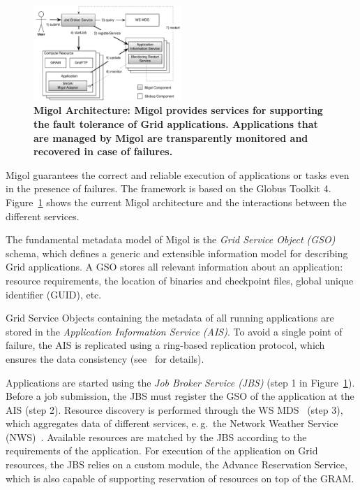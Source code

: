 \documentclass[times, 10pt, twocolumn]{article}
\newcommand{\up}{\vspace*{-1em}}
\begin{document}
\label{sec:migol}

\up
\begin{figure}[h]
 \centering
 \includegraphics[width=0.5\textwidth]{migol_architecture}
 \caption{\small \bf Migol Architecture: Migol provides services for
 supporting the fault tolerance of Grid applications. Applications that are managed by
 Migol are transparently monitored and recovered in case of
 failures.\up\up
 }
 \label{fig:migol_architecture} 
\end{figure}           


Migol guarantees the correct and reliable exe\-cution of applications
or tasks even in the presence of failures. The framework is based on
the Globus Toolkit 4.  Figure~\ref{fig:migol_architecture} shows the
current Migol architecture and the interactions between the different
services.

The fundamental metadata model of Migol is the \emph{Grid Service
  Object (GSO)} schema, which defines a generic and extensible
information model for describing Grid applications.
A GSO stores all relevant information about an application: resource
requirements, the location of binaries and checkpoint files, global
unique identifier (GUID), etc.

Grid Service Objects containing the metadata of all running
applications are stored in the {\em Application Information Service
  (AIS)}.
To avoid a single point of failure, the AIS is replicated using a ring-based
replication protocol, which ensures the data consistency
(see~\cite{Luckow:2008ys} for details).

Applications are started using the {\em Job Broker Service (JBS)}
(step 1 in Figure~\ref{fig:migol_architecture}). Before a job
submission, the JBS must register the GSO of the application at the
AIS (step 2).  Resource discovery is performed through the WS
MDS~\cite{schopf06}  (step 3), which aggregates data of different services,
e.\,g.\ the Network Weather Service (NWS)~\cite{NWS99}.
Available resources are matched by the JBS according to the
requirements of the application. For execution of the application on
Grid resources, the JBS relies on a custom module, the Advance
Reservation Service, which is also capable of supporting reservation
of resources on top of the GRAM.
\end{document}
